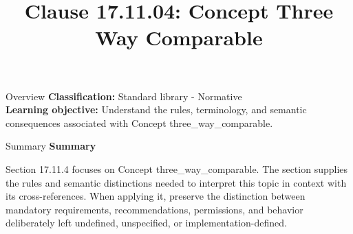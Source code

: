\documentclass[10pt,letterpaper]{article}
\title{Clause 17.11.04: Concept Three Way Comparable}
\author{}
\date{}
\begin{document}
\maketitle
\begin{CornellOverviewBox}{Overview}
\textbf{Classification:} Standard library - Normative\\[2pt]
\textbf{Learning objective:} Understand the rules, terminology, and semantic consequences associated with Concept three\_way\_comparable.
\end{CornellOverviewBox}\begin{CornellSummaryBox}{Summary}
{\sffamily\bfseries\color{Accent} Summary}\par\vspace{3pt}Section 17.11.4 focuses on Concept three\_way\_comparable. The section supplies the rules and semantic distinctions needed to interpret this topic in context with its cross-references. When applying it, preserve the distinction between mandatory requirements, recommendations, permissions, and behavior deliberately left undefined, unspecified, or implementation-defined.
\end{CornellSummaryBox}
\end{document}

